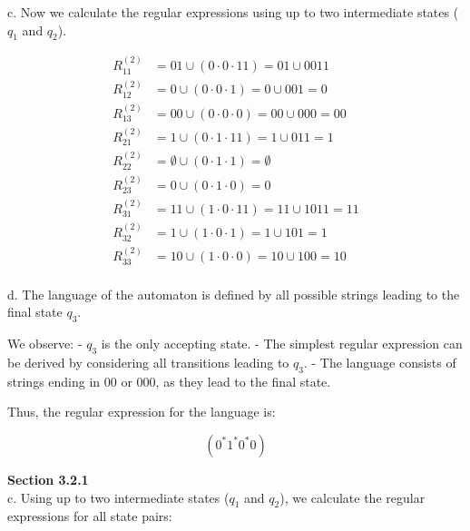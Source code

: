 \documentclass{article}
\theoremstyle{theorem}
\theoremstyle{definition}
\theoremstyle{remark}
\begin{document}
c. Now we calculate the regular expressions using up to two intermediate states (\( q_1 \) and \( q_2 \)).

\[
\begin{aligned}
R_{11}^{(2)} &= 01 \cup (0 \cdot 0 \cdot 11) = 01 \cup 0011 \\
R_{12}^{(2)} &= 0 \cup (0 \cdot 0 \cdot 1) = 0 \cup 001 = 0 \\
R_{13}^{(2)} &= 00 \cup (0 \cdot 0 \cdot 0) = 00 \cup 000 = 00 \\
R_{21}^{(2)} &= 1 \cup (0 \cdot 1 \cdot 11) = 1 \cup 011 = 1 \\
R_{22}^{(2)} &= \emptyset \cup (0 \cdot 1 \cdot 1) = \emptyset \\
R_{23}^{(2)} &= 0 \cup (0 \cdot 1 \cdot 0) = 0 \\
R_{31}^{(2)} &= 11 \cup (1 \cdot 0 \cdot 11) = 11 \cup 1011 = 11 \\
R_{32}^{(2)} &= 1 \cup (1 \cdot 0 \cdot 1) = 1 \cup 101 = 1 \\
R_{33}^{(2)} &= 10 \cup (1 \cdot 0 \cdot 0) = 10 \cup 100 = 10 \\
\end{aligned}
\]

d. The language of the automaton is defined by all possible strings leading to the final state \( q_3 \). 

We observe:
- \( q_3 \) is the only accepting state.
- The simplest regular expression can be derived by considering all transitions leading to \( q_3 \).
- The language consists of strings ending in 00 or 000, as they lead to the final state.

Thus, the regular expression for the language is:

\[
(0^*1^*0^*0)
\]

\textbf{Section 3.2.1} \\
c. Using up to two intermediate states (\( q_1 \) and \( q_2 \)), we calculate the regular expressions for all state pairs:
\end{document}
